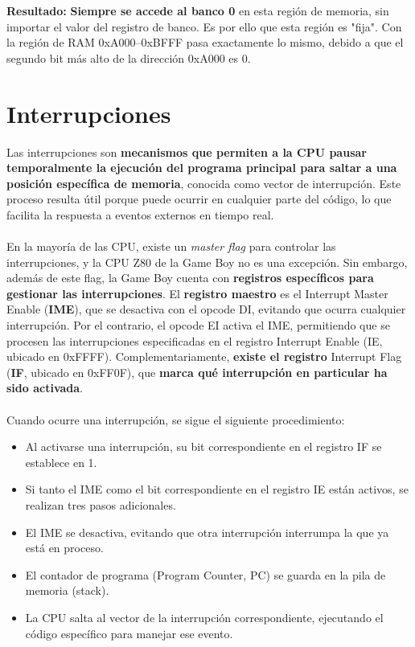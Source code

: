 \textbf{Resultado:} \textbf{Siempre se accede al banco 0} en esta región de memoria, sin importar el valor del registro de banco. Es por ello que esta región es "fija". Con la región de RAM 0xA000–0xBFFF pasa exactamente lo mismo, debido a que el segundo bit más alto de la dirección 0xA000 es 0.

\section{Interrupciones}

Las interrupciones son \textbf{mecanismos que permiten a la CPU pausar temporalmente la ejecución del programa principal para saltar a una posición específica de memoria}, conocida como vector de interrupción. Este proceso resulta útil porque puede ocurrir en cualquier parte del código, lo que facilita la respuesta a eventos externos en tiempo real.
\\\\
En la mayoría de las CPU, existe un \textit{master flag} para controlar las interrupciones, y la CPU Z80 de la Game Boy no es una excepción. Sin embargo, además de este flag, la Game Boy cuenta con \textbf{registros específicos para gestionar las interrupciones}. El \textbf{registro maestro} es el Interrupt Master Enable (\textbf{IME}), que se desactiva con el opcode DI, evitando que ocurra cualquier interrupción. Por el contrario, el opcode EI activa el IME, permitiendo que se procesen las interrupciones especificadas en el registro Interrupt Enable (IE, ubicado en 0xFFFF). Complementariamente, \textbf{existe el registro} Interrupt Flag (\textbf{IF}, ubicado en 0xFF0F), que \textbf{marca qué interrupción en particular ha sido activada}.
\\\\
Cuando ocurre una interrupción, se sigue el siguiente procedimiento:

\begin{itemize}
    \item Al activarse una interrupción, su bit correspondiente en el registro IF se establece en 1.
    \item Si tanto el IME como el bit correspondiente en el registro IE están activos, se realizan tres pasos adicionales.
    \item El IME se desactiva, evitando que otra interrupción interrumpa la que ya está en proceso.
    \item El contador de programa (Program Counter, PC) se guarda en la pila de memoria (stack).
    \item La CPU salta al vector de la interrupción correspondiente, ejecutando el código específico para manejar ese evento.
\end{itemize}
    
